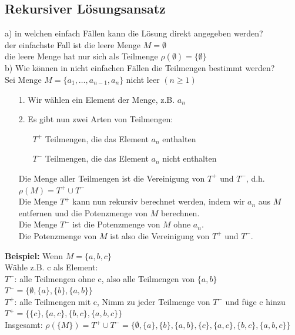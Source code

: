 \documentclass{scrreprt}
\newcommand\tab[1][1cm]{\hspace*{#1}}
\begin{document}
\subsection{Rekursiver Lösungsansatz}
a) in welchen einfach Fällen kann die Lösung direkt angegeben werden?
\\\tab der einfachste Fall ist die leere Menge $M = \emptyset$
\\\tab die leere Menge hat nur sich als Teilmenge $\rho(\emptyset) = \{\emptyset\}$
\\b) Wie können in nicht einfachen Fällen die Teilmengen bestimmt werden?
\\\tab Sei Menge $M = \{a_1,\ldots,a_{n-1},a_n\}$ nicht leer $(n\geq1)$
\begin{itemize}
  \item [1.] Wir wählen ein Element der Menge, z.B. $a_n$
  \item [2.] Es gibt nun zwei Arten von Teilmengen:
  \begin{itemize}
    \item [$T^+$] Teilmengen, die das Element $a_n$ enthalten
    \item [$T^-$] Teilmengen, die das Element $a_n$ nicht enthalten
  \end{itemize}
  Die Menge aller Teilmengen ist die Vereinigung von $T^+$ und $T^-$, d.h. $\rho(M) = T^+ \cup T^-$
  \\Die Menge $T^+$ kann nun rekursiv berechnet werden, indem wir $a_n$ aus $M$ entfernen und die Potenzmenge von $M$ berechnen.
  \\Die Menge $T^-$ ist die Potenzmenge von $M$ ohne $a_n$.
  \\Die Potenzmenge von $M$ ist also die Vereinigung von $T^+$ und $T^-$.
\end{itemize}
\textbf{Beispiel:} Wenn $M = \{a,b,c\}$
\\\tab Wähle z.B. c als Element:
\\\tab $T^-$: alle Teilmengen ohne c, also alle Teilmengen von $\{a,b\}$
\\\tab\tab $T^- =\{\emptyset,\{a\},\{b\},\{a,b\}\}$
\\\tab $T^+$: alle Teilmengen mit c, Nimm zu jeder Teilmenge von $T^-$ und füge c hinzu
\\\tab\tab $T^+ = \{\{c\},\{a,c\},\{b,c\},\{a,b,c\}\}$
\\\tab Insgesamt: $\rho(\{M\}) = T^+ \cup T^- =\{\emptyset,\{a\},\{b\},\{a,b\},\{c\},\{a,c\},\{b,c\},\{a,b,c\}\}$
\end{document}

